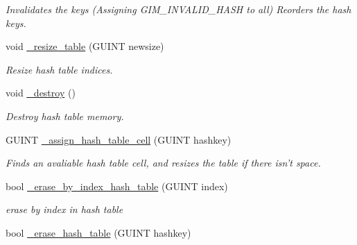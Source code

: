 \begin{DoxyCompactItemize}
\begin{DoxyCompactList}\small\item\em Invalidates the keys (Assigning G\+I\+M\+\_\+\+I\+N\+V\+A\+L\+I\+D\+\_\+\+H\+A\+S\+H to all) Reorders the hash keys. \end{DoxyCompactList}\item 
\hypertarget{classgim__hash__table_a51905040dee4c41954f5de1634c090dd}{void \hyperlink{classgim__hash__table_a51905040dee4c41954f5de1634c090dd}{\+\_\+resize\+\_\+table} (G\+U\+I\+N\+T newsize)}\label{classgim__hash__table_a51905040dee4c41954f5de1634c090dd}

\begin{DoxyCompactList}\small\item\em Resize hash table indices. \end{DoxyCompactList}\item 
\hypertarget{classgim__hash__table_a2b7a2b3eb817edf8af93a85ce910a5ca}{void \hyperlink{classgim__hash__table_a2b7a2b3eb817edf8af93a85ce910a5ca}{\+\_\+destroy} ()}\label{classgim__hash__table_a2b7a2b3eb817edf8af93a85ce910a5ca}

\begin{DoxyCompactList}\small\item\em Destroy hash table memory. \end{DoxyCompactList}\item 
\hypertarget{classgim__hash__table_a93e5bf5c573a39e21e9bd0a4aec38e1a}{G\+U\+I\+N\+T \hyperlink{classgim__hash__table_a93e5bf5c573a39e21e9bd0a4aec38e1a}{\+\_\+assign\+\_\+hash\+\_\+table\+\_\+cell} (G\+U\+I\+N\+T hashkey)}\label{classgim__hash__table_a93e5bf5c573a39e21e9bd0a4aec38e1a}

\begin{DoxyCompactList}\small\item\em Finds an avaliable hash table cell, and resizes the table if there isn't space. \end{DoxyCompactList}\item 
\hypertarget{classgim__hash__table_afbaacd523281706f94476ae60917856e}{bool \hyperlink{classgim__hash__table_afbaacd523281706f94476ae60917856e}{\+\_\+erase\+\_\+by\+\_\+index\+\_\+hash\+\_\+table} (G\+U\+I\+N\+T index)}\label{classgim__hash__table_afbaacd523281706f94476ae60917856e}

\begin{DoxyCompactList}\small\item\em erase by index in hash table \end{DoxyCompactList}\item 
\hypertarget{classgim__hash__table_af03ef67dcf7b0e805e34df6a5de4425f}{bool \hyperlink{classgim__hash__table_af03ef67dcf7b0e805e34df6a5de4425f}{\+\_\+erase\+\_\+hash\+\_\+table} (G\+U\+I\+N\+T hashkey)}\label{classgim__hash__table_af03ef67dcf7b0e805e34df6a5de4425f}


\end{DoxyCompactItemize}
